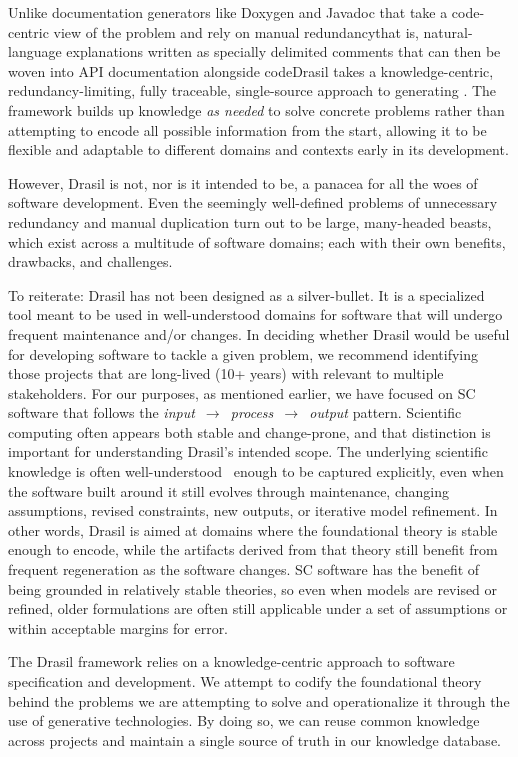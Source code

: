 Unlike documentation generators like Doxygen and Javadoc
that take a code-centric view of the problem and rely on manual
redundancy\textemdash{}that is, natural-language explanations written as
specially delimited comments that can then be woven into API documentation
alongside code\textemdash{}Drasil takes a knowledge-centric,
redundancy-limiting, fully traceable, single-source approach to generating
\sfs{}. The framework builds up knowledge
\emph{as needed} to solve concrete problems rather than attempting to encode 
all possible information from the start, allowing it to be flexible and 
adaptable to different domains and contexts early in its development.

However, Drasil is not, nor is it intended to be, a panacea for all the woes of 
software development. Even the seemingly well-defined problems of unnecessary 
redundancy and manual duplication turn out to be large, many-headed beasts, 
which exist across a multitude of software domains; each with their own 
benefits, drawbacks, and challenges.

To reiterate: Drasil has not been designed as a silver-bullet. It is a 
specialized tool meant to be used in well-understood domains for software that 
will undergo frequent maintenance and/or changes. In deciding whether Drasil 
would be useful for developing software to tackle a given problem, we recommend 
identifying those projects that are long-lived (10+ years) with \sfs{} 
relevant to multiple stakeholders. For our purposes, as mentioned earlier, we 
have focused on SC software that follows the 
\mbox{\emph{input~$\rightarrow$~process~$\rightarrow$~output}} pattern. 
Scientific computing often appears both stable 
and change-prone, and that distinction is important for understanding 
Drasil's intended scope. The underlying scientific knowledge is often 
well-understood~\citep{CaretteEtAl2023} enough to be captured explicitly,
even when the software built around it still evolves through maintenance, 
changing assumptions, revised constraints, new outputs, or iterative model 
refinement. In other words, Drasil is aimed at domains where the foundational 
theory is stable enough to encode, while the artifacts derived from that theory 
still benefit from frequent regeneration as the software changes. SC software 
has the benefit of being grounded in relatively stable theories, so even when 
models are revised or refined, older formulations are often still applicable under a set of 
assumptions or within acceptable margins for error.

The Drasil framework relies on a knowledge-centric approach to software 
specification and development. We attempt to codify the foundational theory 
behind the problems we are attempting to solve and operationalize it through 
the use of generative technologies. By doing so, we can reuse common knowledge 
across projects and maintain a single source of truth in our knowledge database.

